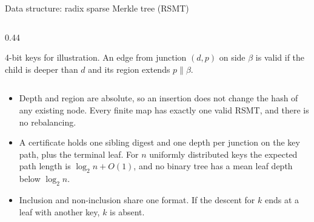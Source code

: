 \documentclass[aspectratio=169,10pt]{beamer}
\newcommand{\cat}{\mathbin{\|}}
\begin{document}
\begin{frame}{Data structure: radix sparse Merkle tree (RSMT)}
\begin{columns}[T]
\begin{column}{0.44\textwidth}
\vspace{1mm}
\raggedright\scriptsize 4-bit keys for illustration. An edge from junction $(d,p)$ on side $\beta$ is valid if the child is deeper than $d$ and its region extends $p \cat \beta$.
\end{column}
\end{columns}

\vspace{1mm}
\small
\begin{itemize}
  \item Depth and region are absolute, so an insertion does not change the hash of any existing node. Every finite map has exactly one valid RSMT, and there is no rebalancing.
  \item A certificate holds one sibling digest and one depth per junction on the key path, plus the terminal leaf. For $n$ uniformly distributed keys the expected path length is $\log_2 n + O(1)$, and no binary tree has a mean leaf depth below $\log_2 n$.
  \item Inclusion and non-inclusion share one format. If the descent for $k$ ends at a leaf with another key, $k$ is absent.
\end{itemize}
\end{frame}
\end{document}
